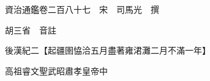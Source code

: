 










 


 
 


 

  
  
  
  
  





  
  
  
  
  
 
  

  

  
  
  



  

 
 

  
   




  

  
  


  　　資治通鑑卷二百八十七　宋　司馬光　撰

　　胡三省　音註

　　後漢紀二【起疆圉恊洽五月盡著雍涒灘二月不滿一年】

　　高祖睿文聖武昭肅孝皇帝中

